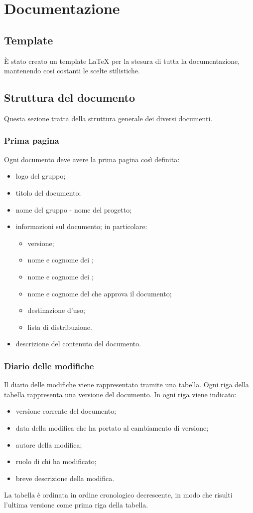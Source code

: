 \section{Documentazione}

\subsection{Template}
È stato creato un template \LaTeX{} per la stesura di tutta la documentazione, mantenendo così costanti le scelte stilistiche.

\subsection{Struttura del documento}
Questa sezione tratta della struttura generale dei diversi documenti.

\subsubsection{Prima pagina}
Ogni documento deve avere la prima pagina così definita:
\begin{itemize}
\item logo del gruppo;
\item titolo del documento;
\item nome del gruppo - nome del progetto;
\item informazioni sul documento; in particolare:
	\begin{itemize}
		\item versione;
		\item nome e cognome dei \Redattori{};
		\item nome e cognome dei \Verificatori{};
		\item nome e cognome del \Responsabile{} che approva il documento;
		\item destinazione d'uso;
		\item lista di distribuzione. 
	\end{itemize}
\item descrizione del contenuto del documento.
\end{itemize}

\subsubsection{Diario delle modifiche}
Il diario delle modifiche viene rappresentato tramite una tabella. Ogni riga della tabella rappresenta una versione del documento. In ogni riga viene indicato: 
\begin{itemize}
	\item versione corrente del documento; 
	\item data della modifica che ha portato al cambiamento di versione; 
	\item autore della modifica;
	\item ruolo di chi ha modificato; 
	\item breve descrizione della modifica. 
\end{itemize}
La tabella è ordinata in ordine cronologico decrescente, in modo che risulti l'ultima versione come prima riga della tabella.

